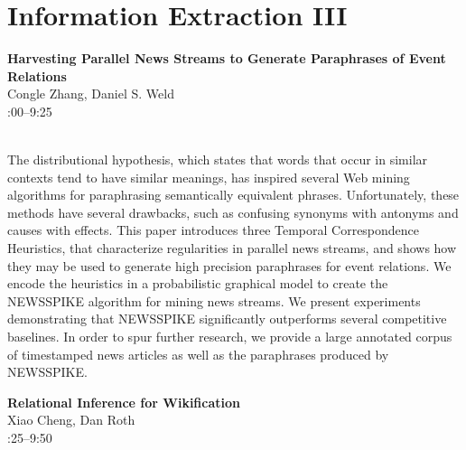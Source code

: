 \documentclass[twoside,makeidx]{book}
\renewcommand{\normalsize}{\fontsize{8}{9}\selectfont}
\renewcommand{\small}{\fontsize{7}{8}\selectfont}
\begin{document}
\section{Information Extraction III}
\vspace{-1em}
\par\vspace{2em}\noindent%
\begin{minipage}{\linewidth}%
\begin{center}
\textbf{\normalsize Harvesting Parallel News Streams to Generate Paraphrases of Event Relations}\\
\normalsize  Congle Zhang,  Daniel S. Weld\\
{\small 9:00--9:25}\\
\end{center}
\end{minipage}\\[0.5em]
\nopagebreak%
\noindent%
{\small The distributional hypothesis, which states that words that occur in similar contexts tend to have similar meanings, has inspired several Web mining algorithms for paraphrasing semantically equivalent phrases. Unfortunately, these methods have several drawbacks, such as confusing synonyms with antonyms and causes with effects. This paper introduces three Temporal Correspondence Heuristics, that characterize regularities in parallel news streams, and shows how they may be used to generate high precision paraphrases for event relations. We encode the heuristics in a probabilistic graphical model to create the NEWSSPIKE algorithm for mining news streams. We present experiments demonstrating that NEWSSPIKE significantly outperforms several competitive baselines. In order to spur further research, we provide a large annotated corpus of timestamped news articles as well as the paraphrases produced by NEWSSPIKE.}
\par\vspace{2em}\noindent%
\begin{minipage}{\linewidth}%
\begin{center}
\textbf{\normalsize Relational Inference for Wikification}\\
\normalsize  Xiao Cheng,  Dan Roth\\
{\small 9:25--9:50}\\
\end{center}
\end{minipage}\\[0.5em]
\nopagebreak%
\noindent%
\end{document}

